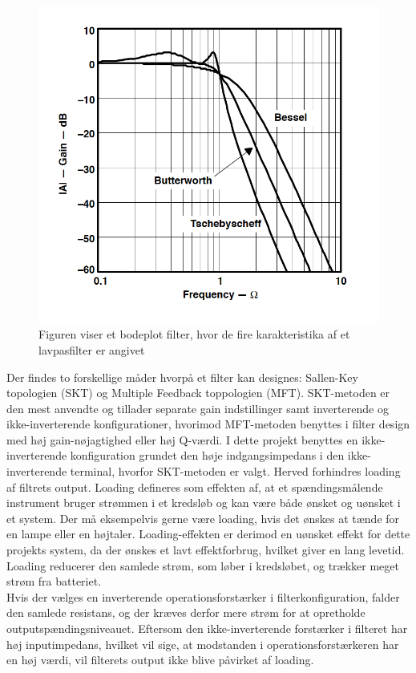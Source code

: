 \begin{figure}[H]
	\centering
	\includegraphics[scale=0.8]{figures/cProblemloesning/type_filtre.PNG}
	\caption{Figuren viser et bodeplot filter, hvor de fire karakteristika af et lavpasfilter er angivet}
	\label{fig:type_filtre}
\end{figure}

Der findes to forskellige måder hvorpå et filter kan designes: Sallen-Key topologien (SKT) og Multiple Feedback toppologien (MFT). SKT-metoden er den mest anvendte og tillader separate gain indstillinger samt inverterende og ikke-inverterende konfigurationer, hvorimod MFT-metoden benyttes i filter design med høj gain-nøjagtighed eller høj Q-værdi. I dette projekt benyttes en ikke-inverterende konfiguration grundet den høje indgangsimpedans i den ikke-inverterende terminal, hvorfor SKT-metoden er valgt. Herved forhindres loading af filtrets output. Loading defineres som effekten af, at et spændingsmålende instrument bruger strømmen i et kredsløb og kan være både ønsket og uønsket i et system. Der må eksempelvis gerne være loading, hvis det ønskes at tænde for en lampe eller en højtaler. Loading-effekten er derimod en uønsket effekt for dette projekts system, da der ønskes et lavt effektforbrug, hvilket giver en lang levetid. Loading reducerer den samlede strøm, som løber i kredsløbet, og trækker meget strøm fra batteriet. \\
Hvis der vælges en inverterende operationsforstærker i filterkonfiguration, falder den samlede resistans, og der kræves derfor mere strøm for at opretholde outputspændingsniveauet. Eftersom den ikke-inverterende forstærker i filteret har høj inputimpedans, hvilket vil sige, at modstanden i operationsforstærkeren har en høj værdi, vil filterets output ikke blive påvirket af loading. \cite{Webster2009,Carter2013,Karni2014}

